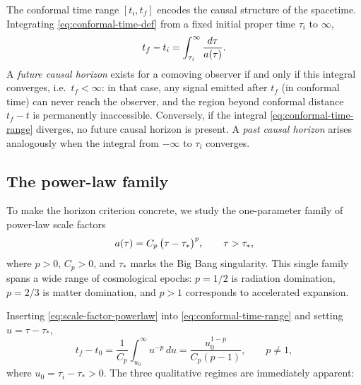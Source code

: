 The conformal time range $[t_{i}, t_{f}]$ encodes the causal structure of
the spacetime.  Integrating \cref{eq:conformal-time-def} from a fixed initial
proper time $\tau_{i}$ to $\infty$,
%
\begin{equation}
  t_{f} - t_{i}
  = \int_{\tau_{i}}^{\infty} \frac{d\tau}{a(\tau)} .
  \label{eq:conformal-time-range}
\end{equation}
%
A \emph{future causal horizon} exists for a comoving observer if and only if
this integral converges, i.e.\ $t_{f} < \infty$: in that case, any signal
emitted after $t_{f}$ (in conformal time) can never reach the observer, and
the region beyond conformal distance $t_{f} - t$ is permanently inaccessible.
Conversely, if the integral \cref{eq:conformal-time-range} diverges, no
future causal horizon is present.  A \emph{past causal horizon} arises
analogously when the integral from $-\infty$ to $\tau_{i}$ converges.

\subsection{The power-law family}
\label{sec:flrw-powerlaw}

To make the horizon criterion concrete, we study the one-parameter family of
power-law scale factors
%
\begin{equation}
  a(\tau) = C_{p}\,\bigl(\tau - \tau_{*}\bigr)^{p} ,
  \qquad \tau > \tau_{*} ,
  \label{eq:scale-factor-powerlaw}
\end{equation}
%
where $p > 0$, $C_{p} > 0$, and $\tau_{*}$ marks the Big Bang
singularity.  This single family spans a wide range of cosmological
epochs: $p = 1/2$ is radiation domination, $p = 2/3$ is matter domination,
and $p > 1$ corresponds to accelerated expansion.

Inserting \cref{eq:scale-factor-powerlaw} into \cref{eq:conformal-time-range}
and setting $u = \tau - \tau_{*}$,
%
\begin{equation}
  t_{f} - t_{0}
  = \frac{1}{C_{p}} \int_{u_{0}}^{\infty} u^{-p}\,du
  = \frac{u_{0}^{1-p}}{C_{p}(p-1)} , \qquad p \neq 1 ,
  \label{eq:powerlaw-conformal-integral}
\end{equation}
%
where $u_{0} = \tau_{i} - \tau_{*} > 0$.  The three qualitative regimes are
immediately apparent:

